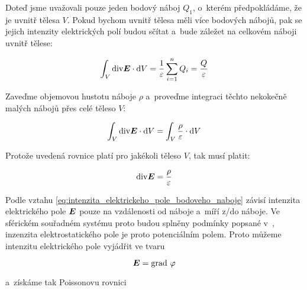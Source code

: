 
Doteď jsme uvažovali pouze jeden bodový náboj \(Q_1\), o~kterém předpokládáme, že je uvnitř tělesa \(V\). Pokud bychom uvnitř tělesa měli více bodových nábojů, pak se jejich intenzity elektrických polí budou sčítat a~bude záležet na celkovém náboji uvnitř tělese: 

\begin{equation}
\int_{V} \mathrm{div} \boldsymbol{E} \cdot \mathrm{d}V = \frac{1}{\varepsilon} \sum_{i=1}^n Q_i = \frac{Q}{\varepsilon}
\end{equation}

Zaveďme objemovou hustotu náboje \(\rho\) a~proveďme integraci těchto nekokečně malých nábojů přes celé těleso \(V\):

\begin{equation}
\int_{V} \mathrm{div} \boldsymbol{E} \cdot \mathrm{d}V = \int_{V} \frac{\rho}{\varepsilon} \cdot \mathrm{d}V
\end{equation}

Protože uvedená rovnice platí pro jakékoli těleso \(V\), tak musí platit:

\begin{equation}
\mathrm{div} \boldsymbol{E} = \frac{\rho}{\varepsilon}
\end{equation}

Podle vztahu \eqref{eq:intenzita_elektrickeho_pole_bodoveho_naboje} závisí intenzita elektrického pole \(\boldsymbol{E}\) pouze na vzdálenosti od náboje a~míří z/do náboje. Ve sférickém souřadném systému proto budou splněny podmínky popsané v~\label{sec:potencial_jednoparametrickeho_pole}, inzenzita elektrostatického pole je proto potenciálním polem. Proto můžeme intenzitu elektrického pole vyjádřit ve tvaru 

\begin{equation}
\boldsymbol{E} = \mathrm{grad} \ \varphi
\end{equation}

a~získáme tak Poissonovu rovnici

